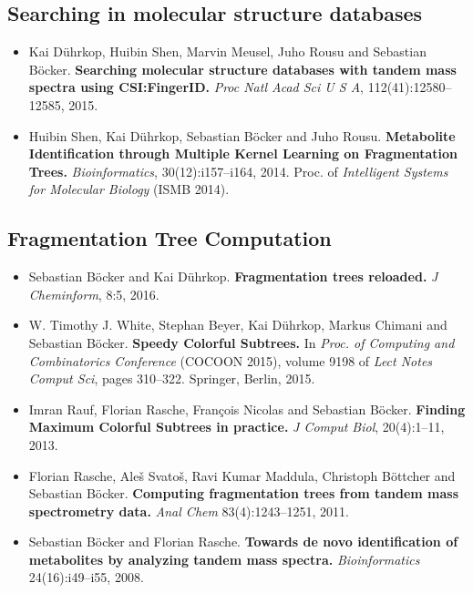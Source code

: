 \documentclass[letterpaper,10pt,openany,oneside]{sphinxmanual}
\begin{document}
\subsection{Searching in molecular structure databases}
\label{introduction:searching-in-molecular-structure-databases}

\begin{itemize}
\item Kai Dührkop, Huibin Shen, Marvin Meusel, Juho Rousu and Sebastian Böcker.
\textbf{Searching molecular structure databases with tandem mass spectra using CSI:FingerID.}
\emph{Proc Natl Acad Sci U S A}, 112(41):12580--12585, 2015. 

\item Huibin Shen, Kai Dührkop, Sebastian Böcker and Juho Rousu.
\textbf{Metabolite Identification through Multiple Kernel Learning on Fragmentation Trees.}
\emph{Bioinformatics}, 30(12):i157--i164, 2014. Proc. of \emph{Intelligent Systems for Molecular Biology} (ISMB 2014).
\end{itemize}

\subsection{Fragmentation Tree Computation}
\label{introduction:fragmentation-tree-computation}

\begin{itemize}
\item Sebastian Böcker and Kai Dührkop.
\textbf{Fragmentation trees reloaded.}
\emph{J Cheminform}, 8:5, 2016.

\item W. Timothy J. White, Stephan Beyer, Kai Dührkop, Markus Chimani and Sebastian Böcker.
\textbf{Speedy Colorful Subtrees.}
In \emph{Proc. of Computing and Combinatorics Conference} (COCOON 2015), volume 9198 of \emph{Lect Notes Comput Sci}, pages 310--322. Springer, Berlin, 2015.

\item Imran Rauf, Florian Rasche, François Nicolas and Sebastian Böcker.
\textbf{Finding Maximum Colorful Subtrees in practice.}
\emph{J Comput Biol}, 20(4):1--11, 2013.

\item Florian Rasche, Aleš Svatoš, Ravi Kumar Maddula, Christoph Böttcher and Sebastian Böcker.
\textbf{Computing fragmentation trees from tandem mass spectrometry data.}
\emph{Anal Chem} 83(4):1243–1251, 2011.

\item Sebastian Böcker and Florian Rasche.
\textbf{Towards de novo identification of metabolites by analyzing tandem mass spectra.}
\emph{Bioinformatics} 24(16):i49--i55, 2008.
\end{itemize}
\end{document}
